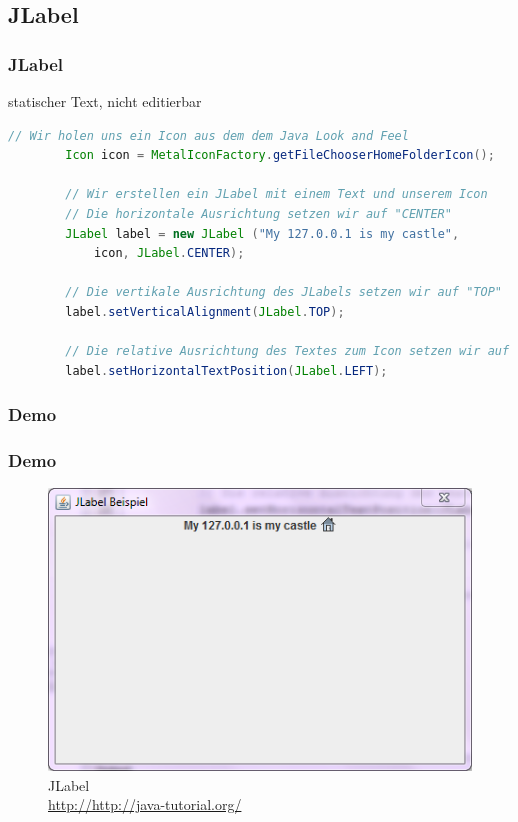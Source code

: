 \documentclass[xcolor=dvipsnames]{beamer}
\begin{document}
\subsection{JLabel}
\begin{frame} %
  \frametitle{JLabel} %
  \begin{block}{statischer Text, nicht editierbar}

  \end{block}

\begin{lstlisting}[language=java,basicstyle=\scriptsize\ttfamily]
// Wir holen uns ein Icon aus dem dem Java Look and Feel
        Icon icon = MetalIconFactory.getFileChooserHomeFolderIcon();
 
        // Wir erstellen ein JLabel mit einem Text und unserem Icon
        // Die horizontale Ausrichtung setzen wir auf "CENTER"
        JLabel label = new JLabel ("My 127.0.0.1 is my castle", 
            icon, JLabel.CENTER);
 
        // Die vertikale Ausrichtung des JLabels setzen wir auf "TOP"
        label.setVerticalAlignment(JLabel.TOP);
 
        // Die relative Ausrichtung des Textes zum Icon setzen wir auf "LEFT"
        label.setHorizontalTextPosition(JLabel.LEFT);	
\end{lstlisting}

 

  

\end{frame}

\subsubsection{Demo}
\begin{frame}
  \frametitle{Demo}
	\begin{figure}
		\includegraphics[scale=0.8]{images/jlabel.PNG}
		\caption{JLabel \\ \tiny{\textcolor{gray}{\url{http://http://java-tutorial.org/}}}}
		\end{figure}
\end{frame}
\end{document}
